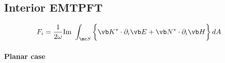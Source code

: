 
\subsection{Interior EMTPFT}

\begin{align*}
F_i&=
 \frac{1}{2\omega}\text{Im } 
 \int_{\mc S}\bigg\{ \vb K^* \cdot \partial_i \vb E
                    +\vb N^* \cdot \partial_i \vb H
             \bigg\}\, dA
\end{align*}

\paragraph{Planar case}

